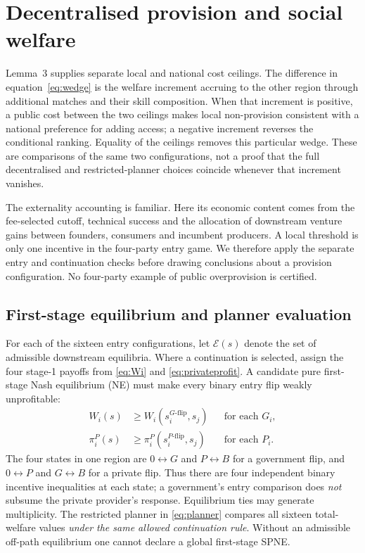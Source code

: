 \section{Decentralised provision and social welfare}\label{sec:welfare}
Lemma~3 supplies separate local and national cost ceilings. The difference in equation~\eqref{eq:wedge} is the welfare increment accruing to the other region through additional matches and their skill composition. When that increment is positive, a public cost between the two ceilings makes local non-provision consistent with a national preference for adding access; a negative increment reverses the conditional ranking. Equality of the ceilings removes this particular wedge. These are comparisons of the same two configurations, not a proof that the full decentralised and restricted-planner choices coincide whenever that increment vanishes.

The externality accounting is familiar. Here its economic content comes from the fee-selected cutoff, technical success and the allocation of downstream venture gains between founders, consumers and incumbent producers. A local threshold is only one incentive in the four-party entry game. We therefore apply the separate entry and continuation checks before drawing conclusions about a provision configuration. No four-party example of public overprovision is certified.

\subsection{First-stage equilibrium and planner evaluation}

For each of the sixteen entry configurations, let $\mathcal E(s)$ denote the set of admissible downstream equilibria. Where a continuation is selected, assign the four stage-1 payoffs from \eqref{eq:Wi} and \eqref{eq:privateprofit}. A candidate pure first-stage Nash equilibrium (NE) must make every binary entry flip weakly unprofitable:
\begin{align}
 W_i(s)&\ge W_i(s_i^{G\text{-flip}},s_j)
       &&\text{for each }G_i,\label{eq:govBR}\\
 \pi_i^P(s)&\ge \pi_i^P(s_i^{P\text{-flip}},s_j)
       &&\text{for each }P_i.\label{eq:privBR}
\end{align}
The four states in one region are $0\leftrightarrow G$ and $P\leftrightarrow B$ for a government flip, and $0\leftrightarrow P$ and $G\leftrightarrow B$ for a private flip. Thus there are four independent binary incentive inequalities at each state; a government's entry comparison does \emph{not} subsume the private provider's response. Equilibrium ties may generate multiplicity. The restricted planner in \eqref{eq:planner} compares all sixteen total-welfare values \emph{under the same allowed continuation rule}. Without an admissible off-path equilibrium one cannot declare a global first-stage SPNE.

